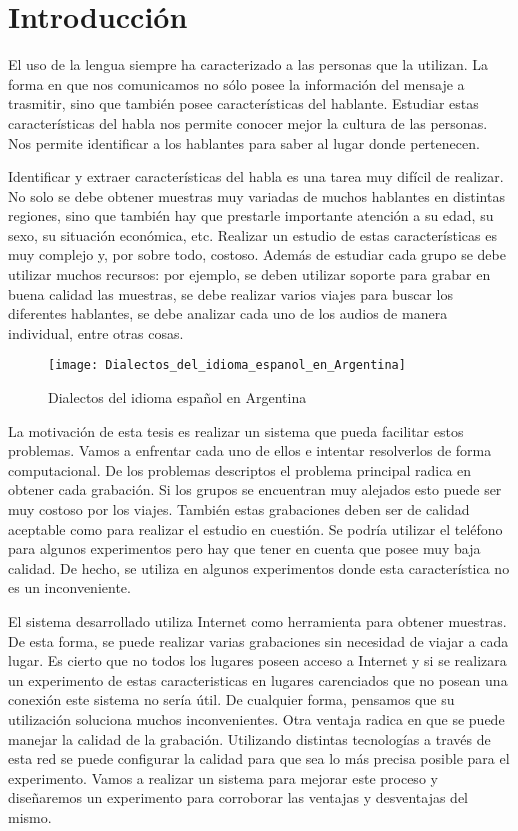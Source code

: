 
\chapter{Introducción}


El uso de la lengua siempre ha caracterizado a las personas que la utilizan. La forma en que nos comunicamos no sólo posee la información del mensaje a trasmitir, sino que también posee características del hablante. Estudiar estas características del habla nos permite conocer mejor la cultura de las personas. Nos permite identificar a los hablantes para saber al lugar donde pertenecen.

Identificar y extraer características del habla es una tarea muy difícil de realizar. No solo se debe obtener muestras muy variadas de muchos hablantes en distintas regiones, sino que también hay que prestarle importante atención a su edad, su sexo, su situación económica, etc. Realizar un estudio de estas características es muy complejo y, por sobre todo, costoso. Además de estudiar cada grupo se debe utilizar muchos recursos: por ejemplo, se deben utilizar soporte para grabar en buena calidad las muestras, se debe realizar varios viajes para buscar los diferentes hablantes, se debe analizar cada uno de los audios de manera individual, entre otras cosas. 

\begin{figure}[h!]
	\centering
    \texttt{[image: Dialectos\_del\_idioma\_espanol\_en\_Argentina]} 
    \caption{Dialectos del idioma español en Argentina}
    \label{fig11}
\end{figure}

La motivación de esta tesis es realizar un sistema que pueda facilitar estos problemas. Vamos a enfrentar cada uno de ellos e intentar resolverlos de forma computacional. De los problemas descriptos el problema principal radica en obtener cada grabación. Si los grupos se encuentran muy alejados esto puede ser muy costoso por los viajes. También estas grabaciones deben ser de calidad aceptable como para realizar el estudio en cuestión. Se podría utilizar el teléfono para algunos experimentos pero hay que tener en cuenta que posee muy baja calidad. De hecho, se utiliza en algunos experimentos donde esta característica no es un inconveniente. 

El sistema desarrollado utiliza Internet como herramienta para obtener muestras. De esta forma, se puede realizar varias grabaciones sin necesidad de viajar a cada lugar. Es cierto que no todos los lugares poseen acceso a Internet y si se realizara un experimento de estas caracteristicas en lugares carenciados que no posean una conexión este sistema no sería útil. De cualquier forma, pensamos que su utilización soluciona muchos inconvenientes. Otra ventaja radica en que se puede manejar la calidad de la grabación. Utilizando distintas tecnologías a través de esta red se puede configurar la calidad para que sea lo más precisa posible para el experimento. Vamos a realizar un sistema para mejorar este proceso y diseñaremos un experimento para corroborar las ventajas y desventajas del mismo.

